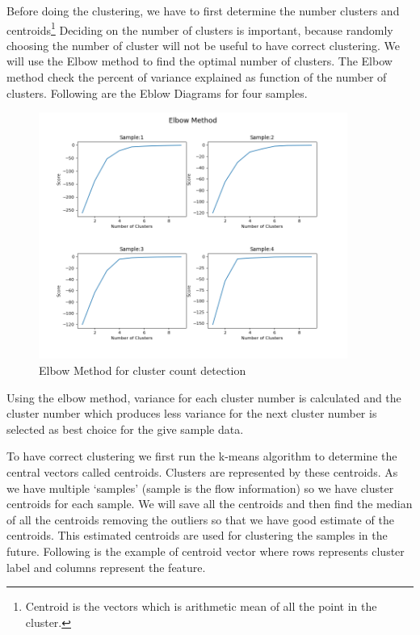 \documentclass[12pt,oneside,a4paper]{article}
\begin{document}
Before doing the clustering, we have to first determine the number clusters and centroids\footnote{Centroid is the vectors which is arithmetic mean of all the point in the cluster.} Deciding on the number of clusters is important, because randomly choosing the number of cluster will not be useful to have correct clustering. We will use the Elbow method to find the optimal number of clusters. The Elbow method check the percent of variance explained as function of the number of clusters. Following are the Eblow Diagrams for four samples.

\begin{figure}[H]
\centering
\includegraphics[width=0.90\textwidth]{elbow-method.png}
\caption{Elbow Method for cluster count detection} \label{fig:elbowmethod}
\end{figure}

Using the elbow method, variance for each cluster number is calculated and the cluster number which produces less variance for the next cluster number is selected as best choice for the give sample data.

To have correct clustering we first run the k-means algorithm to determine the central vectors called centroids. Clusters are represented by these centroids. As we have multiple `samples' (sample is the flow information) so we have cluster centroids for each sample. We will save all the centroids and then find the median of all the centroids removing the outliers so that we have good estimate of the centroids. This estimated centroids are used for clustering the samples in the future. Following is the example of centroid vector where rows represents cluster label and columns represent the feature.
\end{document}

